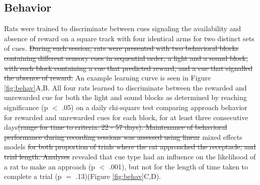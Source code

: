 \documentclass[11pt]{article}
\providecommand{\DIFadd}[1]{{\protect\color{blue}\uwave{#1}}} %
\providecommand{\DIFdel}[1]{{\protect\color{red}\sout{#1}}}                      %
\providecommand{\DIFaddbegin}{} %
\providecommand{\DIFaddend}{} %
\providecommand{\DIFdelbegin}{} %
\providecommand{\DIFdelend}{} %
\newcommand{\DIFscaledelfig}{0.5}
\newlength{\DIFdelgraphicswidth} %
\newlength{\DIFdelgraphicsheight} %
\newcommand{\DIFaddincludegraphics}[2][]{{\color{blue}\fbox{\DIFOincludegraphics[#1]{#2}}}} %
\newcommand{\DIFdelincludegraphics}[2][]{%
\sbox{\DIFdelgraphicsbox}{\DIFOincludegraphics[#1]{#2}}%
\settoboxwidth{\DIFdelgraphicswidth}{\DIFdelgraphicsbox} %
\settoboxtotalheight{\DIFdelgraphicsheight}{\DIFdelgraphicsbox} %
\scalebox{\DIFscaledelfig}{%
\parbox[b]{\DIFdelgraphicswidth}{\usebox{\DIFdelgraphicsbox}\\[-\baselineskip] \rule{\DIFdelgraphicswidth}{0em}}\llap{\resizebox{\DIFdelgraphicswidth}{\DIFdelgraphicsheight}{%
\setlength{\unitlength}{\DIFdelgraphicswidth}%
\begin{picture}(1,1)%
\thicklines\linethickness{2pt} %
{\color[rgb]{1,0,0}\put(0,0){\framebox(1,1){}}}%
{\color[rgb]{1,0,0}\put(0,0){\line( 1,1){1}}}%
{\color[rgb]{1,0,0}\put(0,1){\line(1,-1){1}}}%
\end{picture}%
}\hspace*{3pt}}} %
} %
\DeclareRobustCommand{\DIFaddbegin}{\DIFOaddbegin \let\includegraphics\DIFaddincludegraphics} %
\DeclareRobustCommand{\DIFaddend}{\DIFOaddend \let\includegraphics\DIFOincludegraphics} %
\DeclareRobustCommand{\DIFdelbegin}{\DIFOdelbegin \let\includegraphics\DIFdelincludegraphics} %
\DeclareRobustCommand{\DIFdelend}{\DIFOaddend \let\includegraphics\DIFOincludegraphics} %
\begin{document}
\subsection*{Behavior}

Rats were trained to discriminate between cues signaling the availability and absence of reward on a square track with four identical arms for two distinct sets of cues. \DIFdelbegin \DIFdel{During each session, rats were presented with two behavioral blocks containing different sensory cues in sequential order, a light and a sound block, with each block containing a cue that predicted reward, and a cue that signalled the absence of reward. }\DIFdelend An example learning curve is seen in Figure \ref{fig:behav}A,B. All four rats learned to discriminate between the rewarded and unrewarded cue for both the light and sound blocks as determined by reaching significance (p $<$ .05) on a daily chi-square test comparing approach behavior for rewarded and unrewarded cues for each block, for at least three consecutive days\DIFdelbegin \DIFdel{(range for time to criteria: 22 - 57 days). Maintenance of behavioral performance during recording sessions was assessed using linear }\DIFdelend \DIFaddbegin \DIFadd{. Linear }\DIFaddend mixed effects models \DIFdelbegin \DIFdel{for both proportion of trials where the rat approached the receptacle, and trial length. Analyses }\DIFdelend revealed that cue type had an influence on the likelihood of a rat to make an approach (p $<$ .001), but not for the length of time taken to complete a trial (p $=$ .13)(Figure \ref{fig:behav}C,D).
\end{document}
